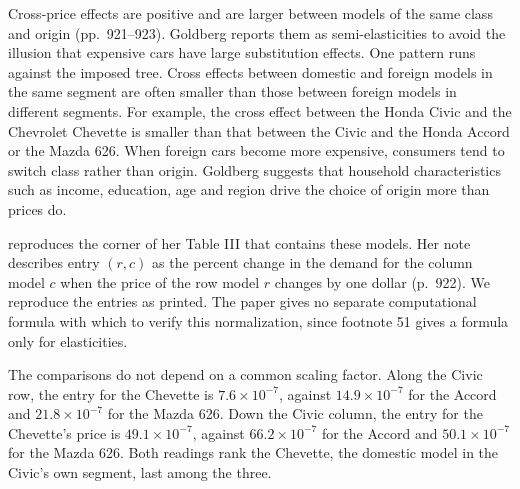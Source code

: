 Cross-price effects are positive and are larger between models of the same class and origin (pp.~921--923).
Goldberg reports them as semi-elasticities to avoid the illusion that expensive cars have large substitution
effects. One pattern runs against the imposed tree. Cross effects between domestic and foreign models in the
same segment are often smaller than those between foreign models in different segments. For example, the cross
effect between the Honda Civic and the Chevrolet Chevette is smaller than that between the Civic and the Honda
Accord or the Mazda 626. When foreign cars become more expensive, consumers tend to switch class rather than
origin. Goldberg suggests that household characteristics such as income, education, age and region drive the
choice of origin more than prices do.

 reproduces the corner of her Table III that contains these models. Her note describes
entry $(r, c)$ as the percent change in the demand for the column model $c$ when the price of the row model $r$
changes by one dollar (p.~922). We reproduce the entries as printed. The paper gives no separate computational
formula with which to verify this normalization, since footnote 51 gives a formula only for elasticities.

The comparisons do not depend on a common scaling factor. Along the Civic row, the entry for the Chevette is $7.6 \times
10^{-7}$, against $14.9 \times 10^{-7}$ for the Accord and $21.8 \times 10^{-7}$ for the Mazda 626. Down the Civic
column, the entry for the Chevette's price is $49.1 \times 10^{-7}$, against $66.2 \times 10^{-7}$ for the Accord
and $50.1 \times 10^{-7}$ for the Mazda 626. Both readings rank the Chevette, the domestic model in the Civic's own
segment, last among the three.

